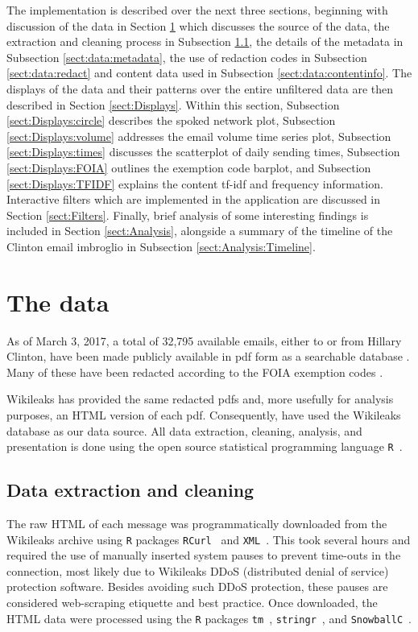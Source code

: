 \documentclass[journal]{vgtc}                %
\begin{document}
The implementation is described over the next three sections, beginning with discussion of the data in Section \ref{sect:data} which discusses the source of the data, the extraction and cleaning process in Subsection \ref{sect:data:extrclean}, the details of the metadata in Subsection \ref{sect:data:metadata}, the use of redaction codes in Subsection \ref{sect:data:redact} and content data used in Subsection \ref{sect:data:contentinfo}. The displays of the data and their patterns over the entire unfiltered data are then described in Section \ref{sect:Displays}. Within this section, Subsection \ref{sect:Displays:circle} describes the spoked network plot, Subsection \ref{sect:Displays:volume} addresses the email volume time series plot, Subsection \ref{sect:Displays:times} discusses the scatterplot of daily sending times, Subsection \ref{sect:Displays:FOIA} outlines the exemption code barplot, and Subsection \ref{sect:Displays:TFIDF} explains the content tf-idf and frequency information. Interactive filters which are implemented in the application are discussed in Section \ref{sect:Filters}. Finally, brief analysis of some interesting findings is included in Section \ref{sect:Analysis}, alongside a summary of the timeline of the Clinton email imbroglio in Subsection \ref{sect:Analysis:Timeline}.

\section{The data}
\label{sect:data}
As of March 3, 2017, a total of 32,795 available emails, either to or from Hillary Clinton, have been made publicly available in pdf form as a searchable database \cite{StateDeptFOIA}.  Many of these have been redacted according to the FOIA exemption codes \cite{FOIA}.  

Wikileaks \cite{Wikileaks} has provided the same redacted pdfs and, more usefully for analysis purposes, an HTML version of each pdf.  Consequently, have used the Wikileaks database as our data source.   All data extraction, cleaning, analysis, and presentation is done using the open source statistical programming language \texttt{R}~\cite{Rsystem}.

\subsection{Data extraction and cleaning}
\label{sect:data:extrclean}
The raw HTML of each message was programmatically downloaded from the Wikileaks archive using \texttt{R} packages  \texttt{RCurl}~\cite{RCurl2016package} and \texttt{XML}~\cite{XML2016package}.  This took several hours and required the use of manually inserted system pauses to prevent time-outs in the connection, most likely due to Wikileaks DDoS (distributed denial of service) protection software. Besides avoiding such DDoS protection, these pauses are considered web-scraping etiquette and best practice.
Once downloaded, the HTML data were processed using the \texttt{R} packages \texttt{tm}~\cite{tm2008paper, tm2017package}, \texttt{stringr}~\cite{stringr2016package}, and \texttt{SnowballC}~\cite{snowballc2014package}.   
\end{document}
